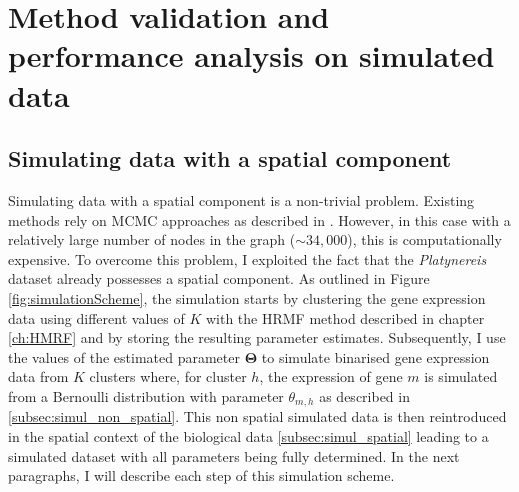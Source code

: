 \chapter{Method validation and performance analysis on simulated data}\label{ch:simulations} 
\section{Simulating data with a spatial component }
Simulating data with a spatial component is a non-trivial problem. Existing methods rely on MCMC approaches as described in \cite{Chalmond89}. However, in this case with a relatively large number of nodes in the graph ($\sim 34,000$), this is computationally expensive. To overcome this problem, I exploited the fact that the {\it{Platynereis}} dataset already possesses a spatial component. As outlined in Figure \ref{fig:simulationScheme}, the simulation starts by clustering the gene expression data using different values of $K$ with the HRMF method described in chapter \ref{ch:HMRF} and by storing the resulting parameter estimates. Subsequently, I use the values of the estimated parameter $\boldsymbol{\Theta}$ to simulate binarised gene expression data from $K$ clusters where, for cluster $h$, the expression of gene $m$ is simulated from a Bernoulli distribution with parameter $\theta_{m,h}$ as described in \ref{subsec:simul_non_spatial}. This non spatial simulated data is then reintroduced in the spatial context of the biological data \ref{subsec:simul_spatial} leading to a simulated dataset with all parameters being fully determined. In the next paragraphs, I will describe each step of this simulation scheme.

